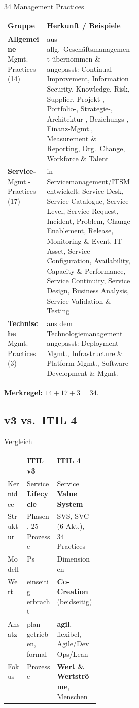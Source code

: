 \documentclass[a4paper, fontsize=7pt]{scrartcl}
\renewcommand*{\arraystretch}{1.5}  %
\begin{document}
\begin{mainbox}{34 Management Practices}
\renewcommand*{\arraystretch}{1.2}
\begin{tabularx}{\linewidth}{@{}>{\raggedright\arraybackslash}p{0.3\linewidth}|>{\raggedright\arraybackslash}X@{}}
\textbf{Gruppe} & \textbf{Herkunft / Beispiele} \\
\hline
\textbf{Allgemeine} Mgmt.-Practices (14) & aus allg.\ Geschäftsmanagement
  übernommen \& angepasst: Continual Improvement, Information Security,
  Knowledge, Risk, Supplier, Projekt-, Portfolio-, Strategie-,
  Architektur-, Beziehungs-, Finanz-Mgmt., Measurement \& Reporting,
  Org.\ Change, Workforce \& Talent \\
\textbf{Service-}Mgmt.-Practices (17) & in Servicemanagement/ITSM
  entwickelt: Service Desk, Service Catalogue, Service Level, Service
  Request, Incident, Problem, Change Enablement, Release, Monitoring \&
  Event, IT Asset, Service Configuration, Availability, Capacity \&
  Performance, Service Continuity, Service Design, Business Analysis,
  Service Validation \& Testing \\
\textbf{Technische} Mgmt.-Practices (3) & aus dem Technologiemanagement
  angepasst: Deployment Mgmt., Infrastructure \& Platform Mgmt., Software
  Development \& Mgmt. \\
\end{tabularx}
\textbf{Merkregel:} $14 + 17 + 3 = 34$.
\end{mainbox}

\subsection{v3 vs.\ ITIL 4}

\begin{mainbox}{Vergleich}
\renewcommand*{\arraystretch}{1.2}
\begin{tabularx}{\linewidth}{@{}>{\raggedright\arraybackslash}p{0.21\linewidth}|>{\raggedright\arraybackslash}X|>{\raggedright\arraybackslash}X@{}}
 & \textbf{ITIL v3} & \textbf{ITIL 4} \\
\hline
Kernidee & Service \textbf{Lifecycle} & Service \textbf{Value System} \\
Struktur & 5 Phasen, 25 Prozesse & SVS, SVC (6 Akt.), 34 Practices \\
Modell & 4 Ps & 4 Dimensionen \\
Wert & einseitig erbracht & \textbf{Co-Creation} (beidseitig) \\
Ansatz & plan-getrieben, formal & \textbf{agil}, flexibel, Agile/DevOps/Lean \\
Fokus & Prozesse & \textbf{Wert \& Wertströme}, Menschen \\
\end{tabularx}
\end{mainbox}
\end{document}
